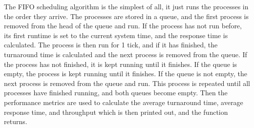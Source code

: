 \documentclass{article}
\theoremstyle{mytheoremstyle}
\theoremstyle{mytheoremstyle}
\theoremstyle{myproblemstyle}
\begin{document}
The FIFO scheduling algorithm is the simplest of all, it just runs the processes in the order they arrive. The processes are stored in a queue, and the first process is removed from the head of the queue and run. If the process has not run before, its first runtime is set to the current system time, and the response time is calculated. The process is then run for 1 tick, and if it has finished, the turnaround time is calculated and the next process is removed from the queue. If the process has not finished, it is kept running until it finishes. If the queue is empty, the process is kept running until it finishes. If the queue is not empty, the next process is removed from the queue and run. This process is repeated until all processes have finished running, and both queues become empty. Then the performance metrics are used to calculate the average turnaround time, average response time, and throughput which is then printed out, and the function returns.
\end{document}
